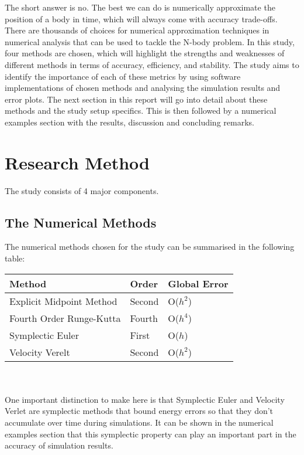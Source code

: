 \documentclass[a4paper,11pt]{article}
\begin{document}
The short answer is no. The best we can do is numerically approximate the position of a body in time, which will always come with accuracy trade-offs. There are thousands of choices for numerical approximation techniques in numerical analysis that can be used to tackle the N-body problem. In this study, four methods are chosen, which will highlight the strengths and weaknesses of different methods in terms of accuracy, efficiency, and stability. The study aims to identify the importance of each of these metrics by using software implementations of chosen methods and analysing the simulation results and error plots. The next section in this report will go into detail about these methods and the study setup specifics. This is then followed by a numerical examples section with the results, discussion and concluding remarks.

\section{Research Method}

The study consists of 4 major components.

\subsection{The Numerical Methods}

The numerical methods chosen for the study can be summarised in the following table: \\

\begin{tabularx}{0.92\textwidth} { 
  | >{\centering\arraybackslash}X 
  | >{\centering\arraybackslash}X 
  | >{\centering\arraybackslash}X | }
 \hline
 \textbf{Method} & \textbf{Order} & \textbf{Global Error} \\
 \hline
 Explicit Midpoint Method  & Second  & O($h ^{2}$)  \\
 \hline
 Fourth Order Runge-Kutta  & Fourth & O($h ^{4}$)  \\
 \hline
 Symplectic Euler  & First  & O($h$)  \\
 \hline
 Velocity Verelt  & Second  & O($h ^{2}$)  \\
 \hline
\end{tabularx} \\ \\

One important distinction to make here is that Symplectic Euler and Velocity Verlet are symplectic methods that bound energy errors so that they don't accumulate over time during simulations. It can be shown in the numerical examples section that this symplectic property can play an important part in the accuracy of simulation results.
\end{document}
